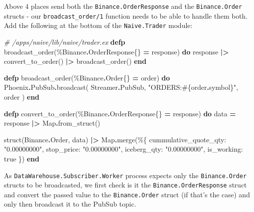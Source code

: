 \documentclass[
  oneside]{book}
\newenvironment{Shaded}{\begin{snugshade}}{\end{snugshade}}
\newcommand{\CommentTok}[1]{\textcolor[rgb]{0.56,0.35,0.01}{\textit{#1}}}
\newcommand{\ConstantTok}[1]{\textcolor[rgb]{0.00,0.00,0.00}{#1}}
\newcommand{\KeywordTok}[1]{\textcolor[rgb]{0.13,0.29,0.53}{\textbf{#1}}}
\newcommand{\NormalTok}[1]{#1}
\newcommand{\OperatorTok}[1]{\textcolor[rgb]{0.81,0.36,0.00}{\textbf{#1}}}
\newcommand{\OtherTok}[1]{\textcolor[rgb]{0.56,0.35,0.01}{#1}}
\newcommand{\StringTok}[1]{\textcolor[rgb]{0.31,0.60,0.02}{#1}}
\newcommand{\VariableTok}[1]{\textcolor[rgb]{0.00,0.00,0.00}{#1}}
\begin{document}
Above 4 places send both the \texttt{Binance.OrderResponse} and the \texttt{Binance.Order} structs - our \texttt{broadcast\_order/1} function needs to be able to handle them both. Add the following at the bottom of the \texttt{Naive.Trader} module:

\begin{Shaded}
\begin{Highlighting}[]
  \CommentTok{\# /apps/naive/lib/naive/trader.ex}
  \KeywordTok{defp}\NormalTok{ broadcast\_order(\%}\ConstantTok{Binance}\OperatorTok{.}\ConstantTok{OrderResponse}\NormalTok{\{\} }\OperatorTok{=}\NormalTok{ response) }\KeywordTok{do}
\NormalTok{    response}
    \OperatorTok{|\textgreater{}}\NormalTok{ convert\_to\_order()}
    \OperatorTok{|\textgreater{}}\NormalTok{ broadcast\_order()}
  \KeywordTok{end}

  \KeywordTok{defp}\NormalTok{ broadcast\_order(\%}\ConstantTok{Binance}\OperatorTok{.}\ConstantTok{Order}\NormalTok{\{\} }\OperatorTok{=}\NormalTok{ order) }\KeywordTok{do}
    \ConstantTok{Phoenix}\OperatorTok{.}\ConstantTok{PubSub}\OperatorTok{.}\NormalTok{broadcast(}
      \ConstantTok{Streamer}\OperatorTok{.}\ConstantTok{PubSub}\NormalTok{,}
      \StringTok{"ORDERS:}\OtherTok{\#\{}\NormalTok{order}\OperatorTok{.}\NormalTok{symbol}\OtherTok{\}}\StringTok{"}\NormalTok{,}
\NormalTok{      order}
\NormalTok{    )}
  \KeywordTok{end}

  \KeywordTok{defp}\NormalTok{ convert\_to\_order(\%}\ConstantTok{Binance}\OperatorTok{.}\ConstantTok{OrderResponse}\NormalTok{\{\} }\OperatorTok{=}\NormalTok{ response) }\KeywordTok{do}
\NormalTok{    data }\OperatorTok{=}
\NormalTok{      response}
      \OperatorTok{|\textgreater{}} \ConstantTok{Map}\OperatorTok{.}\NormalTok{from\_struct()}

\NormalTok{    struct(}\ConstantTok{Binance}\OperatorTok{.}\ConstantTok{Order}\NormalTok{, data)}
    \OperatorTok{|\textgreater{}} \ConstantTok{Map}\OperatorTok{.}\NormalTok{merge(\%\{}
      \VariableTok{cummulative\_quote\_qty:} \StringTok{"0.00000000"}\NormalTok{,}
      \VariableTok{stop\_price:} \StringTok{"0.00000000"}\NormalTok{,}
      \VariableTok{iceberg\_qty:} \StringTok{"0.00000000"}\NormalTok{,}
      \VariableTok{is\_working:} \ConstantTok{true}
\NormalTok{    \})}
  \KeywordTok{end}
\end{Highlighting}
\end{Shaded}

As \texttt{DataWarehouse.Subscriber.Worker} process expects only the \texttt{Binance.Order} structs to be broadcasted, we first check is it the \texttt{Binance.OrderResponse} struct and convert the passed value to the \texttt{Binance.Order} struct (if that's the case) and only then broadcast it to the PubSub topic.
\end{document}
